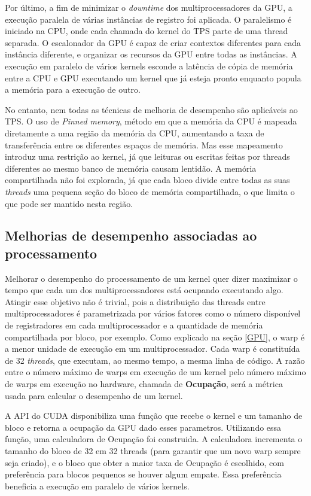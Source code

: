 Por último, a fim de minimizar o \textit{downtime} dos multiprocessadores da GPU, a
execução paralela de várias instâncias de registro foi aplicada. O paralelismo
é iniciado na CPU, onde cada chamada do kernel do TPS parte de uma thread separada.
O escalonador da GPU é capaz de criar contextos diferentes para cada instância
diferente, e organizar os recursos da GPU entre todas as instâncias. A execução
em paralelo de vários kernels esconde a latência de cópia de memória entre a
CPU e GPU executando um kernel que já esteja pronto enquanto popula a memória
para a execução de outro.

No entanto, nem todas as técnicas de melhoria de desempenho são aplicáveis ao
TPS. O uso de \textit{Pinned memory}, método em que a memória da CPU é mapeada
diretamente a uma região da memória da CPU, aumentando a taxa de transferência entre
os diferentes espaços de memória. Mas esse mapeamento introduz uma restrição ao
kernel, já que leituras ou escritas feitas por threads diferentes ao mesmo banco
de memória causam lentidão. A memória compartilhada não foi explorada, já que
cada bloco divide entre todas as suas \textit{threads} uma pequena seção do
bloco de memória compartilhada, o que limita o que pode ser mantido nesta região.

\subsection{Melhorias de desempenho associadas ao processamento}

  Melhorar o desempenho do processamento de um kernel quer dizer maximizar o
tempo que cada um dos multiprocessadores está ocupando executando algo. Atingir
esse objetivo não é trivial, pois a distribuição das threads entre multiprocessadores
é parametrizada por vários fatores como o número disponível de registradores
em cada multiprocessador e a quantidade de memória compartilhada por bloco, por exemplo.
Como explicado na seção \ref{GPU}, o warp é a menor unidade de execução em um
multiprocessador. Cada warp é constituída de 32 \textit{threads}, que executam,
ao mesmo tempo, a mesma linha de código. A razão entre o número máximo de warps
em execução de um kernel pelo número máximo de warps em execução no hardware,
chamada de \textbf{Ocupação}, será a métrica usada para calcular o desempenho
de um kernel.

  A API do CUDA disponibiliza uma função que recebe o kernel e um tamanho de
bloco e retorna a ocupação da GPU dado esses parametros. Utilizando essa função,
uma calculadora de Ocupação foi construida. A calculadora incrementa o
tamanho do bloco de 32 em 32 threads (para garantir que um novo warp sempre
seja criado), e o bloco que obter a maior taxa de Ocupação é escolhido, com
preferência para blocos pequenos se houver algum empate. Essa preferência beneficia
a execução em paralelo de vários kernels.

